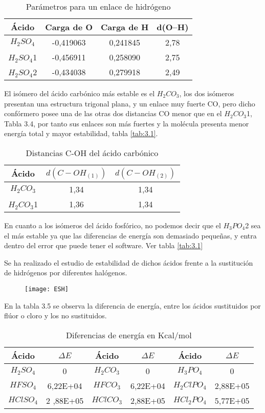\begin{table}[H]
    \centering
    \begin{tabular}{|c|c|c|c|}
    \hline
         Ácido & Carga de O & Carga de H & d(O--H) \\ \hline
        $H_2SO_4$ & -0,419063 & 0,241845 & 2,78 \\ \hline
        $H_2SO_4$1 & -0,456911 & 0,258090 & 2,75 \\ \hline
        $H_2SO_4$2 & -0,434038 & 0,279918 & 2,49 \\ \hline
    \end{tabular}
    \caption{Parámetros para un enlace de hidrógeno}
\end{table}

El isómero del ácido carbónico más estable es el $H_2CO_3$, los dos isómeros presentan una estructura trigonal plana, y un enlace muy fuerte CO, pero dicho confórmero posee una de las otras dos distancias CO menor que en el $H_2CO_3$1, Tabla 3.4, por tanto sus enlaces son más fuertes y la molécula presenta menor energía total y mayor estabilidad, tabla \ref{tab:3.1}.
\begin{table}[H]
    \centering
    \begin{tabular}{|c|c|c|}
    \hline
    Ácido & $d(C-OH_{(1)})$ & $d(C-OH_{(2)})$ \\ \hline
    $H_2CO_3$ & 1,34 & 1,34  \\ \hline
    $H_2CO_3$1 & 1,36 & 1,34 \\ \hline 
    \end{tabular}
    \caption{Distancias C-OH del ácido carbónico}
\end{table}

En cuanto a los isómeros del ácido fosfórico, no podemos decir que el $H_3PO_4$2 sea el más estable ya que las diferencias de energía son demasiado pequeñas, y entra dentro del error que puede tener el software. Ver tabla \ref{tab:3.1}

Se ha realizado el estudio de estabilidad de dichos ácidos frente a la sustitución de hidrógenos por diferentes halógenos.
\begin{figure}[h]
	\centering
	 \texttt{[image: ESH]}
\end{figure}

En la tabla 3.5 se observa la diferencia de energía, entre los ácidos sustituidos por flúor o cloro y los no sustituidos.
\begin{table}
	\centering
	\begin{tabular}{|c|c|c|c|c|c|}
		\hline
	Ácido	& $\Delta E$ &	Ácido	& $\Delta E$ & Ácido & $\Delta E$\\ \hline
$ H_2SO_4$	& 0	& $H_2CO_3$	 & 0 &	$H_3PO_4$	& 0 \\ \hline
$HFSO_4$ &	6,22E+04	& $HFCO_3$	& 6,22E+04	& $H_2ClPO_4$	& 2,88E+05 \\ \hline
$HClSO_4$ &	2 ,88E+05	& $HClCO_3$ &	2,88E+05	& $HCl_2PO_4$ &	5,77E+05 \\ \hline
	\end{tabular}
\caption{Diferencias de energía en Kcal/mol}
\end{table}

